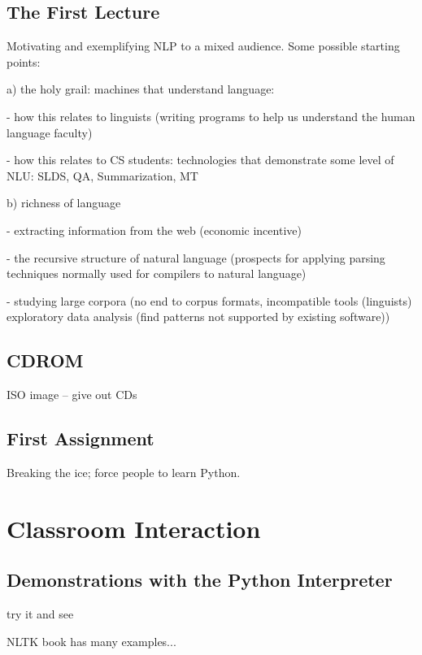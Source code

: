 \documentclass[11pt]{article}
\begin{document}
\subsection{The First Lecture}

Motivating and exemplifying NLP to a mixed audience.
Some possible starting points:

a) the holy grail: machines that understand language:

- how this relates to linguists (writing programs to help us
  understand the human language faculty)

- how this relates to CS students: technologies that demonstrate some level of NLU:
  SLDS, QA, Summarization, MT

b) richness of language

- extracting information from the web (economic incentive)

- the recursive structure of natural language (prospects for applying
  parsing techniques normally used for compilers to natural language)

- studying large corpora
  (no end to corpus formats, incompatible tools (linguists)
  exploratory data analysis (find patterns not supported by existing software))

\subsection{CDROM}

ISO image -- give out CDs

\subsection{First Assignment}

Breaking the ice; force people to learn Python.




\section{Classroom Interaction}
\label{sec:classroom-interaction}

\subsection{Demonstrations with the Python Interpreter}

try it and see

NLTK book has many examples...
\end{document}
